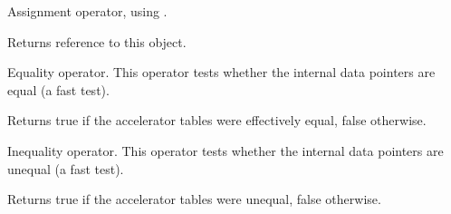 \label{wxacceleratortableassign}


Assignment operator, using .




Returns reference to this object.

\label{wxacceleratortableequal}


Equality operator. This operator tests whether the internal data pointers are
equal (a fast test).




Returns true if the accelerator tables were effectively equal, false otherwise.

\label{wxacceleratortablenotequal}


Inequality operator. This operator tests whether the internal data pointers are
unequal (a fast test).




Returns true if the accelerator tables were unequal, false otherwise.


